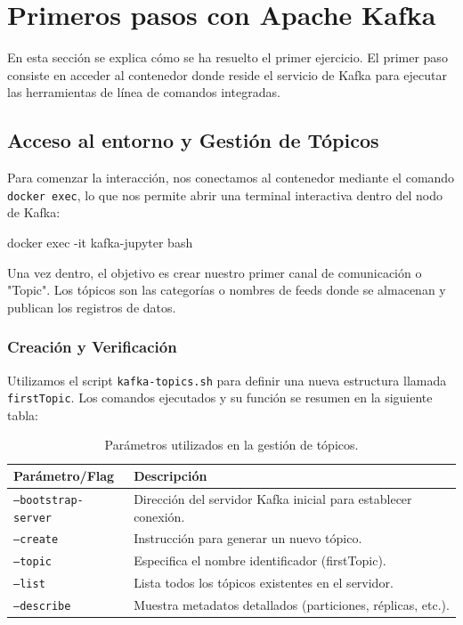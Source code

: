 \documentclass[
	a4paper, %
	12pt, %
]{CSSullivanBusinessReport}
\begin{document}
\section{Primeros pasos con Apache Kafka}

En esta sección se explica cómo se ha resuelto el primer ejercicio. El primer paso consiste en acceder al contenedor donde reside el servicio de Kafka para ejecutar las herramientas de línea de comandos integradas.

\subsection{Acceso al entorno y Gestión de Tópicos}

Para comenzar la interacción, nos conectamos al contenedor mediante el comando \texttt{docker exec}, lo que nos permite abrir una terminal interactiva dentro del nodo de Kafka:

\begin{vscodeTerminal}
docker exec -it kafka-jupyter bash
\end{vscodeTerminal}

Una vez dentro, el objetivo es crear nuestro primer canal de comunicación o "Topic". Los tópicos son las categorías o nombres de feeds donde se almacenan y publican los registros de datos.

\subsubsection{Creación y Verificación}

Utilizamos el script \texttt{kafka-topics.sh} para definir una nueva estructura llamada \texttt{firstTopic}. Los comandos ejecutados y su función se resumen en la siguiente tabla:

\begin{table}[h]
\centering
\begin{tabular}{|l|p{10cm}|}
\hline
\textbf{Parámetro/Flag} & \textbf{Descripción} \\ \hline
\texttt{--bootstrap-server} & Dirección del servidor Kafka inicial para establecer conexión. \\ \hline
\texttt{--create} & Instrucción para generar un nuevo tópico. \\ \hline
\texttt{--topic} & Especifica el nombre identificador (firstTopic). \\ \hline
\texttt{--list} & Lista todos los tópicos existentes en el servidor. \\ \hline
\texttt{--describe} & Muestra metadatos detallados (particiones, réplicas, etc.). \\ \hline
\end{tabular}
\caption{Parámetros utilizados en la gestión de tópicos.}
\end{table}
\end{document}
